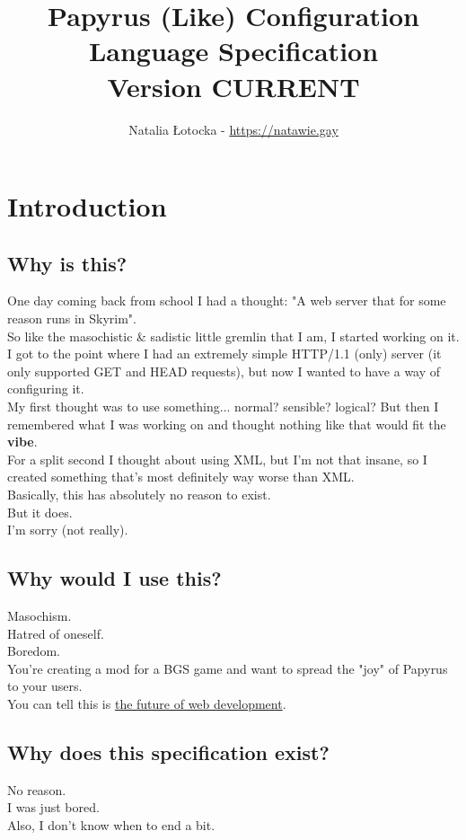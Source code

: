 \documentclass[12pt]{article}
\title{%
    Papyrus (Like) Configuration Language Specification\texorpdfstring{\\}{}
    \large Version CURRENT
}
\author{\foreignlanguage{polish}{Natalia Łotocka} - \texorpdfstring{\url{https://natawie.gay}}{https://natawie.gay}}
\begin{document}
    \maketitle
    \tableofcontents
    \newpage

    \section{Introduction}
    \subsection{Why is this?}
    One day coming back from school I had a thought: "A web server that for some reason runs in Skyrim". \\
    So like the masochistic \& sadistic little gremlin that I am, I started working on it. \\
    I got to the point where I had an extremely simple HTTP/1.1 (only) server (it only supported GET and HEAD requests), but now I wanted to have a way of configuring it. \\
    My first thought was to use something... normal? sensible? logical? But then I remembered what I was working on and thought nothing like that would fit the \textbf{vibe}. \\
    For a split second I thought about using XML, but I'm not that insane, so I created something that's most definitely way worse than XML. \\
    Basically, this has absolutely no reason to exist. \\
    But it does. \\
    I'm sorry (not really).

    \subsection{Why would I use this?}
    Masochism. \\
    Hatred of oneself. \\
    Boredom. \\
    You're creating a mod for a BGS game and want to spread the "joy" of Papyrus to your users. \\
    You can tell this is \href{https://github.com/natawie/PapyrusLikeConfigurationLanguageToHTML}{the future of web development}.

    \subsection{Why does this specification exist?}
    No reason. \\
    I was just bored. \\
    Also, I don't know when to end a bit.
\end{document}
